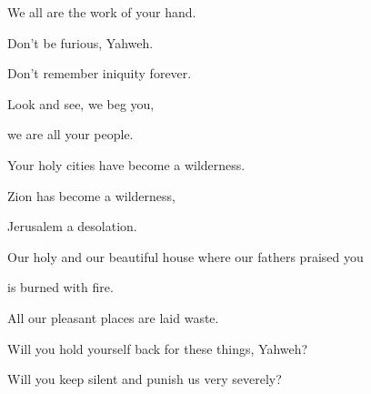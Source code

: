 {\par }{\QB We all are the work of your hand.
\par }{\Q {}Don’t be furious, Yahweh.
\par }{\QB Don’t remember iniquity forever.
\par }{\Q Look and see, we beg you,
\par }{\QB we are all your people.
\par }{\Q {}Your holy cities have become a wilderness.
\par }{\QB Zion has become a wilderness,
\par }{\QB Jerusalem a desolation.
\par }{\Q {}Our holy and our beautiful house where our fathers praised you
\par }{\QB is burned with fire.
\par }{\QB All our pleasant places are laid waste.
\par }{\Q {}Will you hold yourself back for these things, Yahweh?
\par }{\QB Will you keep silent and punish us very severely?

}
